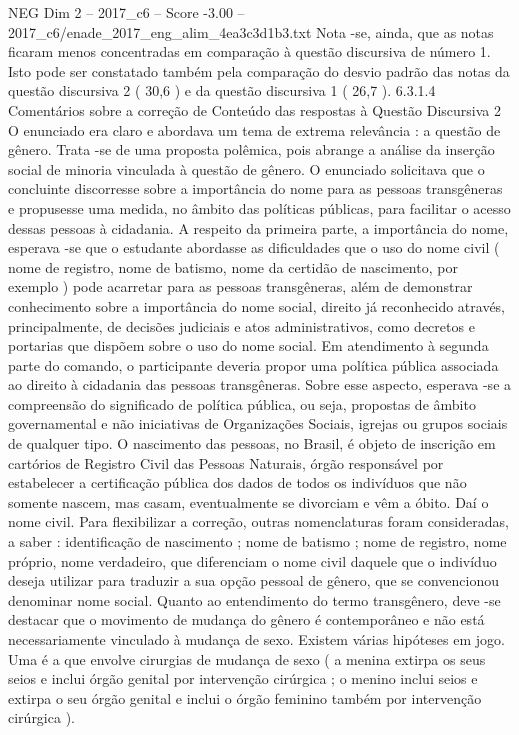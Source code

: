 \begin{textsample}{NEG Dim 2 – 2017\_c6 – Score -3.00 – 2017\_c6/enade\_2017\_eng\_alim\_4ea3c3d1b3.txt}
Nota -se, ainda, que as notas ficaram menos concentradas em comparação à questão discursiva de número 1.
Isto pode ser constatado também pela comparação do desvio padrão das notas da questão discursiva 2 ( 30,6 ) e da questão discursiva 1 ( 26,7 ). 6.3.1.4 Comentários sobre a correção de Conteúdo das respostas à Questão Discursiva 2 O enunciado era claro e abordava um tema de extrema relevância : a questão de gênero.
Trata -se de uma proposta polêmica, pois abrange a análise da inserção social de minoria vinculada à questão de gênero.
O enunciado solicitava que o concluinte discorresse sobre a importância do nome para as pessoas transgêneras e propusesse uma medida, no âmbito das políticas públicas, para facilitar o acesso dessas pessoas à cidadania.
A respeito da primeira parte, a importância do nome, esperava -se que o estudante abordasse as dificuldades que o uso do nome civil ( nome de registro, nome de batismo, nome da certidão de nascimento, por exemplo ) pode acarretar para as pessoas transgêneras, além de demonstrar conhecimento sobre a importância do nome social, direito já reconhecido através, principalmente, de decisões judiciais e atos administrativos, como decretos e portarias que dispõem sobre o uso do nome social.
Em atendimento à segunda parte do comando, o participante deveria propor uma política pública associada ao direito à cidadania das pessoas transgêneras.
Sobre esse aspecto, esperava -se a compreensão do significado de política pública, ou seja, propostas de âmbito governamental e não iniciativas de Organizações Sociais, igrejas ou grupos sociais de qualquer tipo.
O nascimento das pessoas, no Brasil, é objeto de inscrição em cartórios de Registro Civil das Pessoas Naturais, órgão responsável por estabelecer a certificação pública dos dados de todos os indivíduos que não somente nascem, mas casam, eventualmente se divorciam e vêm a óbito.
Daí o nome civil.
Para flexibilizar a correção, outras nomenclaturas foram consideradas, a saber : identificação de nascimento ; nome de batismo ; nome de registro, nome próprio, nome verdadeiro, que diferenciam o nome civil daquele que o indivíduo deseja utilizar para traduzir a sua opção pessoal de gênero, que se convencionou denominar nome social.
Quanto ao entendimento do termo transgênero, deve -se destacar que o movimento de mudança do gênero é contemporâneo e não está necessariamente vinculado à mudança de sexo.
Existem várias hipóteses em jogo.
Uma é a que envolve cirurgias de mudança de sexo ( a menina extirpa os seus seios e inclui órgão genital por intervenção cirúrgica ; o menino inclui seios e extirpa o seu órgão genital e inclui o órgão feminino também por intervenção cirúrgica ).

\end{textsample}

